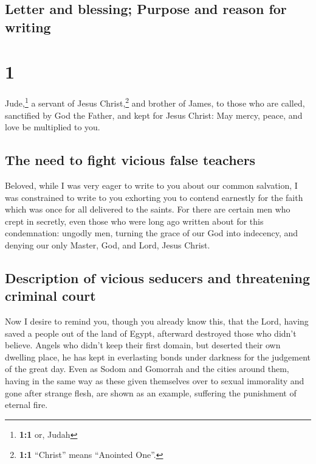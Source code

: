 \hypertarget{letter-and-blessing-purpose-and-reason-for-writing}{%
\subsection{Letter and blessing; Purpose and reason for
writing}\label{letter-and-blessing-purpose-and-reason-for-writing}}

\hypertarget{section}{%
\section{1}\label{section}}

 Jude,\footnote{\textbf{1:1} or, Judah} a servant of Jesus
Christ,\footnote{\textbf{1:1} ``Christ'' means ``Anointed One''.} and
brother of James, to those who are called, sanctified by God the Father,
and kept for Jesus Christ:  May mercy, peace, and love be
multiplied to you.

\hypertarget{the-need-to-fight-vicious-false-teachers}{%
\subsection{The need to fight vicious false
teachers}\label{the-need-to-fight-vicious-false-teachers}}

 Beloved, while I was very eager to write to you about our
common salvation, I was constrained to write to you exhorting you to
contend earnestly for the faith which was once for all delivered to the
saints.  For there are certain men who crept in secretly,
even those who were long ago written about for this condemnation:
ungodly men, turning the grace of our God into indecency, and denying
our only Master, God, and Lord, Jesus Christ.

\hypertarget{description-of-vicious-seducers-and-threatening-criminal-court}{%
\subsection{Description of vicious seducers and threatening criminal
court}\label{description-of-vicious-seducers-and-threatening-criminal-court}}

 Now I desire to remind you, though you already know this,
that the Lord, having saved a people out of the land of Egypt, afterward
destroyed those who didn't believe.  Angels who didn't
keep their first domain, but deserted their own dwelling place, he has
kept in everlasting bonds under darkness for the judgement of the great
day.  Even as Sodom and Gomorrah and the cities around
them, having in the same way as these given themselves over to sexual
immorality and gone after strange flesh, are shown as an example,
suffering the punishment of eternal fire.

